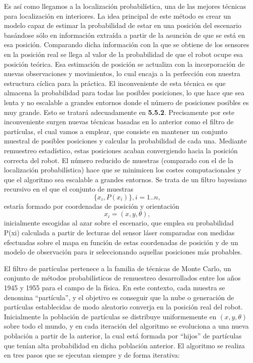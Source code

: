 Es así como llegamos a la localización probabilística, una de las mejores técnicas para localización en interiores. La idea principal de este método es crear un modelo capaz de estimar la probabilidad de estar en una posición del escenario basándose sólo en información extraída a partir de la asunción de que se está en esa posición. Comparando dicha información con la que se obtiene de los sensores en la posición real se llega al valor de la probabilidad de que el robot ocupe esa posición teórica. Esa estimación de posición se actualiza con la incorporación de nuevas observaciones y movimientos, lo cual encaja a la perfección con nuestra estructura cíclica para la práctica. El inconveniente de esta técnica es que almacena la probabilidad para todas las posibles posiciones, lo que hace que sea lenta y no escalable a grandes entornos donde el número de posiciones posibles es muy grande. Esto se tratará adecuadamente en \textbf{5.5.2}. Precisamente por este inconveniente surgen nuevas técnicas basadas en lo anterior como el filtro de partículas, el cual vamos a emplear, que consiste en mantener un conjunto muestral de posibles posiciones y calcular la probabilidad de cada una. Mediante remuestreo estadístico, estas posiciones acaban convergiendo hacia la posición correcta del robot. El número reducido de muestras (comparado con el de la localización probabilística) hace que se minimicen los costes computacionales y que el algoritmo sea escalable a grandes entornos. Se trata de un filtro bayesiano recursivo en el que el conjunto de muestras
\begin{equation}
\{x_{i},P(x_{i})\}, i = 1..n,
\end{equation} estaría formado por coordenadas de posición y orientación
\begin{equation}
x_{i} = (x, y, \theta),
\end{equation} inicialmente escogidas al azar sobre el escenario, que emplea su probabilidad P(xi) calculada a partir de lecturas del sensor láser comparadas con medidas efectuadas sobre el mapa en función de estas coordenadas de posición y de un modelo de observación para ir seleccionando aquellas posiciones más probables.

El filtro de partículas pertenece a la familia de técnicas de Monte Carlo, un conjunto de métodos probabilísticos de remuestreo desarrollados entre los años 1945 y 1955 para el campo de la física. En este contexto, cada muestra se denomina “partícula”, y el objetivo es conseguir que la nube o generación de partículas establecidas de modo aleatorio converja en la posición real del robot. Inicialmente la población de partículas se distribuye uniformemente en $(x,y, \theta)$ sobre todo el mundo, y en cada iteración del algoritmo se evoluciona a una nueva población a partir de la anterior, la cual está formada por “hijos” de partículas que tenían alta probabilidad en dicha población anterior. El algoritmo se realiza en tres pasos que se ejecutan siempre y de forma iterativa:

